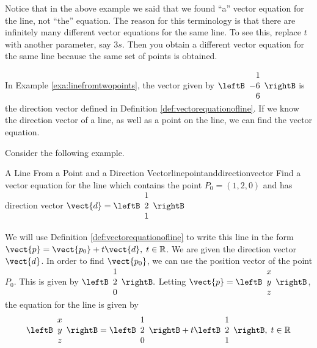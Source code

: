 Notice that in the above example we said that we found ``a'' vector
equation for the line, not ``the'' equation.  The reason for this
terminology is that there are infinitely many different vector 
equations for the same line. To see this, replace $t$ with another
parameter, say $3s.$ Then you obtain a different vector equation for the same
line because the same set of points is obtained.

In Example \ref{exa:linefromtwopoints}, the vector given by 
$\leftB
\begin{array}{r}
 1 \\
-6 \\
6 
\end{array}
\rightB$
is the direction vector defined in Definition \ref{def:vectorequationofline}.
If we know the direction vector of a line, as well as a point on the line,
we can find the vector equation. 

Consider the following example. 

\begin{example}{A Line From a Point and a Direction Vector}{linepointanddirectionvector}
Find a vector equation for the line which contains the point $P_0 = \left(
1,2,0\right) $ and has direction vector $\vect{d} = 
\leftB
\begin{array}{c}
1 \\
2 \\
1
\end{array}
\rightB
$
\end{example}

\begin{solution}
We will use Definition \ref{def:vectorequationofline} to write this line in the form 
$\vect{p}=\vect{p_0}+t\vect{d},\; t\in \mathbb{R}$. We are given the direction vector $\vect{d}$. 
In order to find $\vect{p_0}$, we can use the position vector of the point $P_0$. 
This is given by 
$\leftB
\begin{array}{c}
1 \\
2 \\
0
\end{array}
\rightB.
$
Letting $\vect{p}
=
\leftB
\begin{array}{c}
 x \\
y \\
z
\end{array}
\rightB
$,
the equation for the line is given by 
\begin{equation}
\leftB
\begin{array}{c}
x \\
y \\
z
\end{array}
\rightB
=
\leftB
\begin{array}{c}
1 \\
2 \\
0
\end{array}
\rightB
+ 
t
\leftB
\begin{array}{c}
1 \\
2 \\
1
\end{array}
\rightB,
\;t\in
\mathbb{R} \label{vectoreqn}
\end{equation}
\end{solution}

